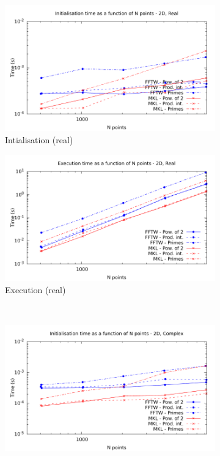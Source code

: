 \documentclass[12pt, a4paper]{article}
\begin{document}
\begin{figure}[H]
\captionsetup{width=0.8\linewidth}
\centering
\begin{subfigure}{.5\textwidth}
\centering
\includegraphics[width=.9\linewidth]{graphs/2d-init-r.pdf}
\caption{Intialisation (real)}
\label{2DRI}
\end{subfigure}%
\begin{subfigure}{.5\textwidth}
\centering
\includegraphics[width=.9\linewidth]{graphs/2d-exec-r.pdf}
\caption{Execution (real)}
\label{2DR}
\end{subfigure}\\
\begin{subfigure}{.5\textwidth}
\centering
\includegraphics[width=.9\linewidth]{graphs/2d-init-c.pdf}

\end{subfigure}
\end{figure}
\end{document}
